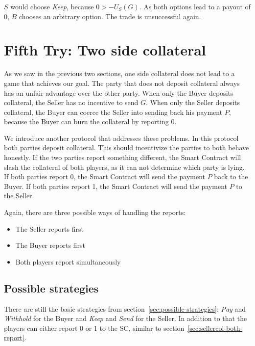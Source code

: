 \documentclass{cacthesis}
\begin{document}
$S$ would choose \emph{Keep}, because $0>-U_S(G)$.
As both options lead to a payout of 0, $B$ chooses an arbitrary option. The trade is unsuccessful again.


\section{Fifth Try: Two side collateral}
\label{sec:two-side-collateral}
As we saw in the previous two sections, one side collateral does not lead to a game that achieves our goal. The party that does not deposit collateral always has an unfair advantage over the other party.
When only the Buyer deposits collateral, the Seller has no incentive to send $G$.
When only the Seller deposits collateral, the Buyer can coerce the Seller into sending back his payment $P$, because the Buyer can burn the collateral by reporting 0.\newline 

We introduce another protocol that addresses these problems. In this protocol both parties deposit collateral. This should incentivize the parties to both behave honestly.
If the two parties report something different, the Smart Contract will slash the collateral of both players, as it can not determine which party is lying. If both parties report 0, the Smart Contract will send the payment $P$ back to the Buyer. If both parties report 1, the Smart Contract will send the payment $P$ to the Seller.  \newline

Again, there are three possible ways of handling the reports:
\begin{itemize}
    \item The Seller reports first
    \item The Buyer reports first
    \item Both players report simultaneously
\end{itemize}
\subsection{Possible strategies}
There are still the basic strategies from section~\ref{sec:possible-strategies}: \emph{Pay} and \emph{Withhold} for the Buyer and \emph{Keep} and \emph{Send} for the Seller. In addition to that the players can either report 0 or 1 to the SC, similar to section~\ref{sec:sellercol-both-report}.
\end{document}
